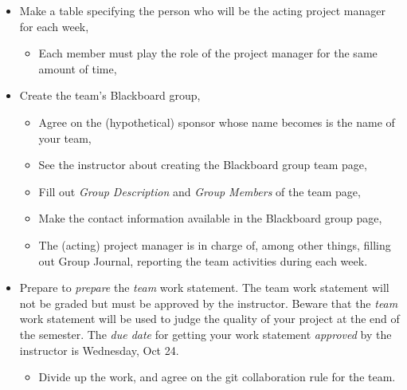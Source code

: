 \documentclass[12pt]{article}
\begin{document}
\begin{itemize}
    \item Make a table specifying the person who will be the acting project manager for each week,
        \begin{itemize}
            \item Each member must play the role of the project manager for the same amount of time,
        \end{itemize}
    \item Create the team's Blackboard group,
        \begin{itemize}
            \item Agree on the (hypothetical) sponsor whose name becomes is the name of your team,
            \item See the instructor about creating the Blackboard group team page,
            \item Fill out \emph{Group Description} and \emph{Group Members} of the team page,
            \item Make the contact information available in the Blackboard
                group page,
            \item The (acting) project manager is in charge of, among other
                things, filling out Group Journal, reporting the team
                activities during each week.
        \end{itemize}
    \item Prepare to \emph{prepare} the \emph{team} work statement.  The team work
        statement will not be graded but must be approved by the instructor.   
        Beware that the \emph{team} work statement will be
        used to judge the quality of your project at the end of the semester. 
        The \emph{due date} for getting your work statement \emph{approved} by
        the instructor is Wednesday, Oct 24.
        \begin{itemize}
            \item Divide up the work, and agree on the git collaboration rule
                for the team.
        \end{itemize}
\end{itemize}


\nocite{*}

\end{document}

